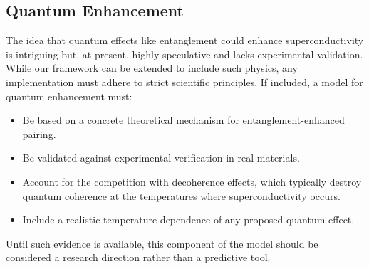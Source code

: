 \subsection{Quantum Enhancement}
The idea that quantum effects like entanglement could enhance superconductivity is intriguing but, at present, highly speculative and lacks experimental validation. While our framework can be extended to include such physics, any implementation must adhere to strict scientific principles. If included, a model for quantum enhancement must:
\begin{itemize}
    \item Be based on a concrete theoretical mechanism for entanglement-enhanced pairing.
    \item Be validated against experimental verification in real materials.
    \item Account for the competition with decoherence effects, which typically destroy quantum coherence at the temperatures where superconductivity occurs.
    \item Include a realistic temperature dependence of any proposed quantum effect.
\end{itemize}
Until such evidence is available, this component of the model should be considered a research direction rather than a predictive tool.
